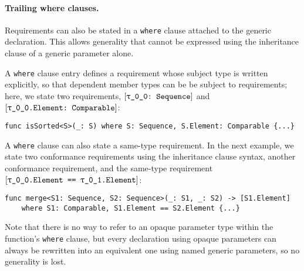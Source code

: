 \documentclass[../generics]{subfiles}
\begin{document}
\paragraph{Trailing where clauses.} Requirements can also be stated in a \texttt{where} clause attached to the generic declaration. This allows generality that cannot be expressed using the inheritance clause of a generic parameter alone.

A \texttt{where} clause entry defines a requirement whose subject type is written explicitly, so that dependent member types can be be subject to requirements; here, we state two requirements, $\rTSequence$ and $\ConfReq{\rT.Element}{Comparable}$:
\begin{Verbatim}
func isSorted<S>(_: S) where S: Sequence, S.Element: Comparable {...}
\end{Verbatim}

A \texttt{where} clause can also state a same-type requirement. In the next example, we state two conformance requirements using the inheritance clause syntax, another conformance requirement, and the same-type requirement $\SameReq{\rT.Element}{\rU.Element}$:
\begin{Verbatim}
func merge<S1: Sequence, S2: Sequence>(_: S1, _: S2) -> [S1.Element]
    where S1: Comparable, S1.Element == S2.Element {...}
\end{Verbatim}

Note that there is no way to refer to an opaque parameter type within the function's \texttt{where} clause, but every declaration using opaque parameters can always be rewritten into an equivalent one using named generic parameters, so no generality is lost.
\end{document}

